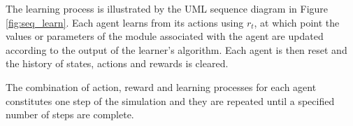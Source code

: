 The learning process is illustrated by the UML sequence diagram in Figure
\ref{fig:seq_learn}.  Each agent learns from its actions using $r_t$, at which
point the values or parameters of the module associated with the agent are
updated according to the output of the learner's algorithm.  Each agent is then
reset and the history of states, actions and rewards is cleared.

The combination of action, reward and learning processes for each agent
constitutes one step of the simulation and they are repeated until a specified
number of steps are complete.

%
